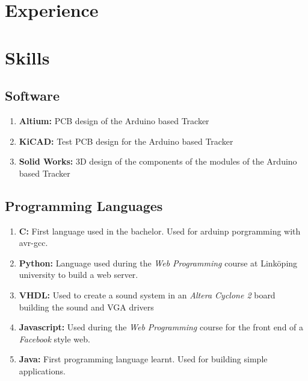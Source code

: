 \documentclass[letterpaper]{twentysecondcv-eng} %
\begin{document}
\section{Experience}

\begin{twenty} %
\end{twenty}

\section{Skills}
\subsection{Software}
\begin{enumerate}
	\item \textbf{Altium:} PCB design of the Arduino based Tracker
	\item \textbf{KiCAD:} Test PCB design for the Arduino based Tracker
	\item \textbf{Solid Works:} 3D design of the components of the modules of the Arduino based Tracker
\end{enumerate}

\subsection{Programming Languages}
\begin{enumerate}
	\item \textbf{C:} First language used in the bachelor. Used for arduinp porgramming with avr-gcc.
		\item \textbf{Python:} Language used during the {\it Web Programming} course at  Link\"oping university to build a web server.
	\item \textbf{VHDL:} Used to create a sound system in an {\it Altera Cyclone 2} board building the sound and VGA drivers
	\item \textbf{Javascript: } Used during the {\it Web Programming} course for the  front end of a {\it Facebook} style web.
	\item \textbf{Java: } First programming language learnt. Used for building simple applications.
\end{enumerate}
\end{document}
